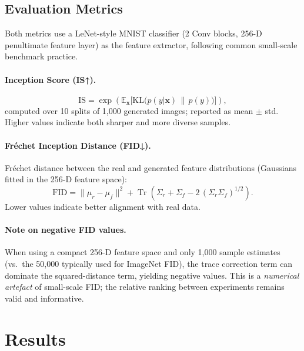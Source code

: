 \documentclass[11pt,a4paper]{article}
\begin{document}
\subsection{Evaluation Metrics}

Both metrics use a LeNet-style MNIST classifier (2 Conv blocks, 256-D
penultimate feature layer) as the feature extractor, following common
small-scale benchmark practice.

\paragraph{Inception Score (IS↑).}
\begin{equation}
  \mathrm{IS} = \exp\!\left(\mathbb{E}_{\mathbf{x}}\bigl[
    \mathrm{KL}\bigl(p(y|\mathbf{x})\,\|\,p(y)\bigr)\bigr]\right),
\end{equation}
computed over 10 splits of 1,000 generated images; reported as mean $\pm$ std.
Higher values indicate both sharper and more diverse samples.

\paragraph{Fréchet Inception Distance (FID↓).}
Fréchet distance between the real and generated feature distributions
(Gaussians fitted in the 256-D feature space):
\begin{equation}
  \mathrm{FID} = \|\mu_r - \mu_f\|^2
    + \operatorname{Tr}\!\left(\Sigma_r + \Sigma_f
      - 2\,(\Sigma_r\Sigma_f)^{1/2}\right).
\end{equation}
Lower values indicate better alignment with real data.

\paragraph{Note on negative FID values.}
When using a compact 256-D feature space and only 1,000 sample estimates
(vs.\ the 50,000 typically used for ImageNet FID), the trace correction term
can dominate the squared-distance term, yielding negative values. This is a
\emph{numerical artefact} of small-scale FID; the relative ranking between
experiments remains valid and informative.

\section{Results}
\end{document}
